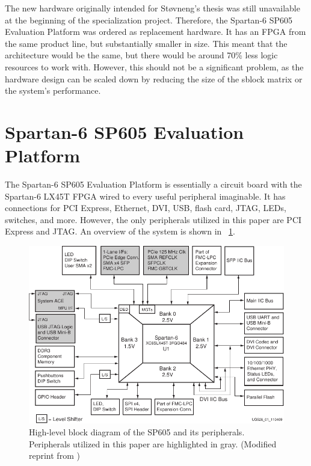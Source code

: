 The new hardware originally intended for Støvneng's thesis was still unavailable at the beginning of the specialization project.
Therefore, the Spartan-6 SP605 Evaluation Platform was ordered as replacement hardware.
It has an FPGA from the same product line, but substantially smaller in size.
This meant that the architecture would be the same, but there would be around 70\% less logic resources to work with.
However, this should not be a significant problem, as the hardware design can be scaled down by reducing the size of the sblock matrix or the system's performance.

\section{Spartan-6 SP605 Evaluation Platform}

The Spartan-6 SP605 Evaluation Platform is essentially a circuit board with the Spartan-6 LX45T FPGA wired to every useful peripheral imaginable.
It has connections for PCI Express\footnotemark, Ethernet, DVI, USB, flash card, JTAG, LEDs, switches, and more.
However, the only peripherals utilized in this paper are PCI Express and JTAG.
An overview of the system is shown in \figurename~\ref{fig:sp605}.


\begin{figure}[!ht]
    \centering
    \includegraphics[width=\textwidth]{figures/sp605-modified}
    \caption[SP605]{
        High-level block diagram of the SP605 and its peripherals.
        Peripherals utilized in this paper are highlighted in gray.
        (Modified reprint from \cite{ug526})
    }
    \label{fig:sp605}
\end{figure}

